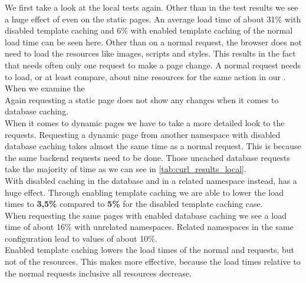 \noindent{}We first take a look at the local tests again.
Other than in the \curl{} test results we see a huge effect of \lare{} even on the static pages.
An average \lare{} load time of about 31\% with disabled template caching and 6\% with enabled template caching of the normal load time can be seen here.
Other than on a normal request, the browser does not need to load the resources like images, scripts and styles.
This results in the fact that \lare{} needs often only one request to make a page change.
A normal request needs to load, or at least compare, about nine resources for the same action in our \webApplication{}.
\\
When we examine the 
\\
Again requesting a static page does not show any changes when it comes to database caching.
\\
When it comes to dynamic pages we have to take a more detailed look to the requests.
Requesting a dynamic page from another \lare{} namespace with disabled database caching takes almost the same time as a normal request.
This is because the same backend requests need to be done.
Those uncached database requests take the majority of time as we can see in \ref{tab:curl_results_local}.
\\
With disabled caching in the database and in a related namespace instead, \lare{} has a huge effect.
Through enabling template caching we are able to lower the load times to \textbf{3,5\%} compared to \textbf{5\%} for the disabled template caching case.
\\
When requesting the same pages with enabled database caching we see a \lare{} load time of about 16\% with unrelated namespaces.
Related namespaces in the same configuration lead to values of about 10\%.
\\
Enabled template caching lowers the load times of the normal and \lare{} requests, but not of the resources.
This makes \lare{} more effective, because the load times relative to the normal requests inclusive all resources decrease.






